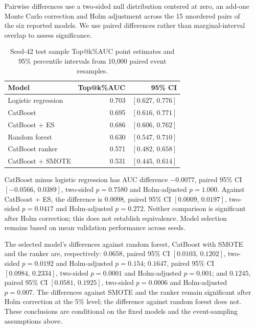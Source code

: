 \documentclass{ieeeaccess}
\begin{document}
\textcolor{revisionblue}{Pairwise differences use a two-sided null distribution centered at zero, an add-one Monte Carlo correction and Holm adjustment across the 15 unordered pairs of the six reported models. We use paired differences rather than marginal-interval overlap to assess significance.}

\begin{table}[!tbp]
    \centering
    \small
    \setlength{\tabcolsep}{5pt}
    \renewcommand{\arraystretch}{1.15}
    \caption{\textcolor{revisionblue}{Seed-42 test sample Top@k\%AUC point estimates and 95\% percentile intervals from 10{,}000 paired event resamples.}}
    \begin{tabular}{lrr}
        \toprule
        Model & Top@k\%AUC & 95\% CI \\
        \midrule
        \textcolor{revisionblue}{Logistic regression} & \textcolor{revisionblue}{0.703} & \textcolor{revisionblue}{$[0.627,\,0.776]$} \\
        \textcolor{revisionblue}{CatBoost} & \textcolor{revisionblue}{0.695} & \textcolor{revisionblue}{$[0.616,\,0.771]$} \\
        \textcolor{revisionblue}{CatBoost + ES} & \textcolor{revisionblue}{0.686} & \textcolor{revisionblue}{$[0.606,\,0.762]$} \\
        \textcolor{revisionblue}{Random forest} & \textcolor{revisionblue}{0.630} & \textcolor{revisionblue}{$[0.547,\,0.710]$} \\
        \textcolor{revisionblue}{CatBoost ranker} & \textcolor{revisionblue}{0.571} & \textcolor{revisionblue}{$[0.482,\,0.658]$} \\
        \textcolor{revisionblue}{CatBoost + SMOTE} & \textcolor{revisionblue}{0.531} & \textcolor{revisionblue}{$[0.445,\,0.614]$} \\
        \bottomrule
    \end{tabular}
    \label{table:significance_ci}
\end{table}

\textcolor{revisionblue}{CatBoost minus logistic regression has AUC difference $-0.0077$, paired 95\% CI $[-0.0566,\,0.0389]$, two-sided $p=0.7580$ and Holm-adjusted $p=1.000$. Against CatBoost + ES, the difference is $0.0098$, paired 95\% CI $[0.0009,\,0.0197]$, two-sided $p=0.0417$ and Holm-adjusted $p=0.272$. Neither comparison is significant after Holm correction; this does not establish equivalence. Model selection remains based on mean validation performance across seeds.}

\textcolor{revisionblue}{The selected model's differences against random forest, CatBoost with SMOTE and the ranker are, respectively: $0.0658$, paired 95\% CI $[0.0103,\,0.1202]$, two-sided $p=0.0192$ and Holm-adjusted $p=0.154$; $0.1647$, paired 95\% CI $[0.0984,\,0.2334]$, two-sided $p=0.0001$ and Holm-adjusted $p=0.001$; and $0.1245$, paired 95\% CI $[0.0581,\,0.1925]$, two-sided $p=0.0006$ and Holm-adjusted $p=0.007$. The differences against SMOTE and the ranker remain significant after Holm correction at the 5\% level; the difference against random forest does not. These conclusions are conditional on the fixed models and the event-sampling assumptions above.}
\end{document}
